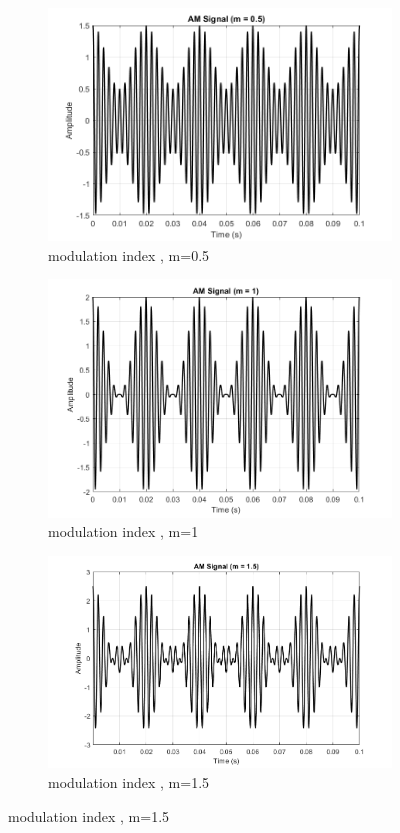 \documentclass[a4paper,12pt]{article}
\begin{document}
\begin{figure}[H]
	\begin{subfigure}[t]{0.49\textwidth}
		\centering
		\includegraphics[width=1\linewidth]{Images/3.3}
		\caption{ modulation index , m=0.5}
	\end{subfigure}
	\hfil
	\begin{subfigure}[t]{0.49\textwidth}
		\centering
		\includegraphics[width=1\linewidth]{Images/4.4}
		\caption{modulation index , m=1}
	\end{subfigure}
	
	\begin{subfigure}[t]{0.55\textwidth}
		\centering
		\includegraphics[width=1\linewidth]{Images/5.5}
		\caption{ modulation index , m=1.5}
	\end{subfigure}
\end{figure}
\end{document}
